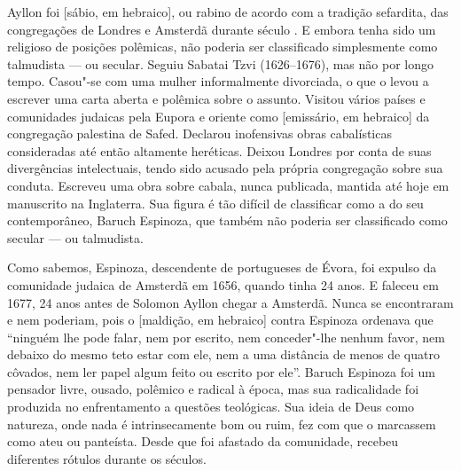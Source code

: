 \pagebreak

\vspace*{1.5cm}


\bigskip

\hfill{}

\bigskip
\bigskip
\bigskip

Ayllon foi {} [sábio, em hebraico], ou rabino de acordo com a tradição sefardita, das congregações de Londres e Amsterdã durante século . E embora tenha sido um religioso de posições polêmicas, não poderia ser classificado simplesmente como talmudista --- ou secular. Seguiu Sabatai Tzvi (1626--1676), mas não por longo tempo. Casou"-se com uma mulher informalmente divorciada, o que o levou a escrever uma carta aberta e polêmica sobre o assunto. Visitou vários países e comunidades judaicas pela Eupora e oriente como {} [emissário, em hebraico] da congregação palestina de Safed. Declarou inofensivas obras cabalísticas consideradas até então altamente heréticas. Deixou Londres por conta de suas divergências intelectuais, tendo sido acusado pela própria congregação sobre sua conduta. Escreveu uma obra sobre cabala, nunca publicada, mantida até hoje em manuscrito na Inglaterra. Sua figura é tão difícil de classificar como a do seu contemporâneo, Baruch Espinoza, que também não poderia ser classificado como secular --- ou talmudista.

Como sabemos, Espinoza, descendente de portugueses de Évora, foi expulso da comunidade judaica de Amsterdã em 1656, quando tinha 24 anos. E faleceu em 1677, 24 anos antes de Solomon Ayllon chegar a Amsterdã. Nunca se encontraram e nem poderiam, pois o {} [maldição, em hebraico] contra Espinoza ordenava que ``ninguém lhe pode falar, nem por escrito, nem conceder"-lhe nenhum favor, nem debaixo do mesmo teto estar com ele, nem a uma distância de menos de quatro côvados, nem ler papel algum feito ou escrito por ele''. Baruch Espinoza foi um pensador livre, ousado, polêmico e radical à época, mas sua radicalidade foi produzida no enfrentamento a questões teológicas. Sua ideia de Deus como natureza, onde nada é intrinsecamente bom ou ruim, fez com que o marcassem como ateu ou panteísta. Desde que foi afastado da comunidade, recebeu diferentes rótulos durante os séculos. 

